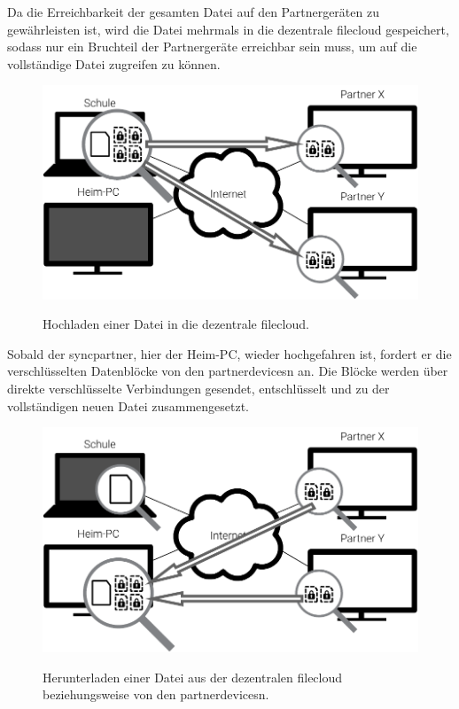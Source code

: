 Da die Erreichbarkeit der gesamten Datei auf den Partnergeräten zu gewährleisten
ist, wird die Datei mehrmals
in die dezentrale \gls{filecloud} gespeichert, sodass nur ein Bruchteil der
Partnergeräte erreichbar sein muss, um auf die vollständige Datei zugreifen zu
können.

\begin{figure}[htb]
	\centering
  \includegraphics[]{images/sblit_upload}
	\label{sblit_upload}
  \caption{Hochladen einer Datei in die dezentrale \gls*{filecloud}.}
\end{figure}

Sobald der \gls{syncpartner}, hier der Heim-PC, wieder hochgefahren ist, fordert er die
verschlüsselten Datenblöcke von den \glspl{partnerdevice}n an. Die Blöcke werden über
direkte verschlüsselte Verbindungen gesendet, entschlüsselt und zu der
vollständigen neuen Datei zusammengesetzt.

\begin{figure}[htb]
	\centering
  \includegraphics[]{images/sblit_download}
	\label{sblit_download}
  \caption{Herunterladen einer Datei aus der dezentralen \gls*{filecloud} beziehungsweise
	von den \glspl{partnerdevice}n.}
\end{figure}
